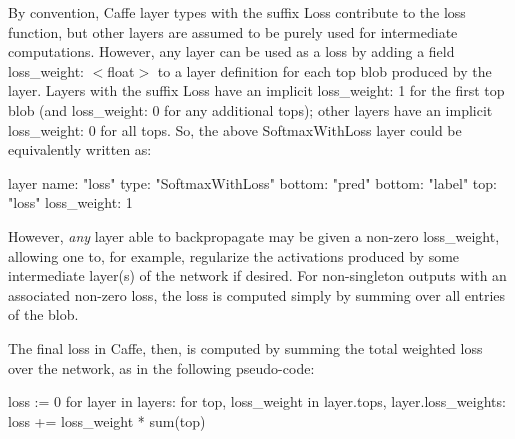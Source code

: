 By convention, Caffe layer types with the suffix {\ttfamily Loss} contribute to the loss function, but other layers are assumed to be purely used for intermediate computations. However, any layer can be used as a loss by adding a field {\ttfamily loss\+\_\+weight\+: $<$float$>$} to a layer definition for each {\ttfamily top} blob produced by the layer. Layers with the suffix {\ttfamily Loss} have an implicit {\ttfamily loss\+\_\+weight\+: 1} for the first {\ttfamily top} blob (and {\ttfamily loss\+\_\+weight\+: 0} for any additional {\ttfamily top}s); other layers have an implicit {\ttfamily loss\+\_\+weight\+: 0} for all {\ttfamily top}s. So, the above {\ttfamily Softmax\+With\+Loss} layer could be equivalently written as\+: \begin{DoxyVerb}layer {
  name: "loss"
  type: "SoftmaxWithLoss"
  bottom: "pred"
  bottom: "label"
  top: "loss"
  loss_weight: 1
}
\end{DoxyVerb}


However, {\itshape any} layer able to backpropagate may be given a non-\/zero {\ttfamily loss\+\_\+weight}, allowing one to, for example, regularize the activations produced by some intermediate layer(s) of the network if desired. For non-\/singleton outputs with an associated non-\/zero loss, the loss is computed simply by summing over all entries of the blob.

The final loss in Caffe, then, is computed by summing the total weighted loss over the network, as in the following pseudo-\/code\+: \begin{DoxyVerb}loss := 0
for layer in layers:
  for top, loss_weight in layer.tops, layer.loss_weights:
    loss += loss_weight * sum(top)\end{DoxyVerb}
 